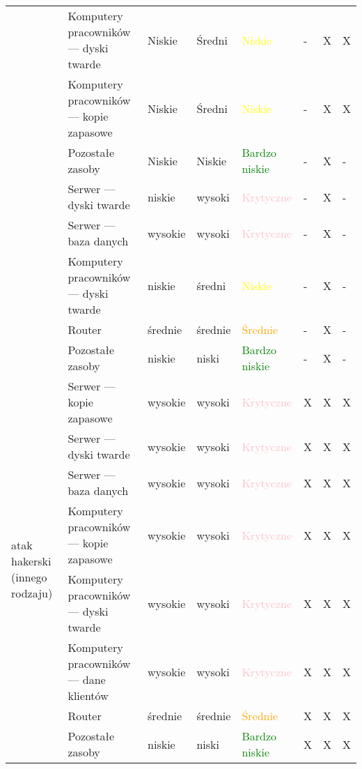 \begin{landscape}
\begin{longtable}[ht!]{|m{3cm}|m{6cm}|m{4.5cm}|m{3cm}|m{3cm}|m{0.5cm}|m{0.5cm}|m{0.5cm}|}
		& Komputery pracowników --- dyski twarde & Niskie & Średni & \textcolor{yellow}{Niskie} & - & X & X  \\ \cline{2-8}
		& Komputery pracowników --- kopie zapasowe & Niskie & Średni & \textcolor{yellow}{Niskie} & - & X & X  \\ \cline{2-8}
		& Pozostałe zasoby & Niskie & Niskie & \textcolor{green}{Bardzo niskie} & - & X & -  \\
		\hline
		\newpage
		\hline
		\multirow{4}{4cm}{atak DDoS}
		& Serwer --- dyski twarde & niskie  & wysoki & \textcolor{pink}{Krytyczne} & - & X & -  \\ \cline{2-8}
		& Serwer --- baza danych & wysokie & wysoki & \textcolor{pink}{Krytyczne} & - & X & -  \\ \cline{2-8} 
		& Komputery pracowników --- dyski twarde  & niskie  & średni & \textcolor{yellow}{Niskie} & - & X & -  \\ \cline{2-8}
		& Router & średnie  & średnie & \textcolor{orange}{Średnie} & - & X & -  \\ \cline{2-8} 
		& Pozostałe zasoby & niskie  & niski & \textcolor{green}{Bardzo niskie} & - & X & -  \\
		\hline
		\multirow{8}{4cm}{atak hakerski \linebreak (innego rodzaju)}
		& Serwer --- kopie zapasowe  & wysokie & wysoki & \textcolor{pink}{Krytyczne} & X & X & X  \\ \cline{2-8}
		& Serwer --- dyski twarde & wysokie  & wysoki & \textcolor{pink}{Krytyczne} & X & X & X  \\ \cline{2-8}
		& Serwer --- baza danych & wysokie & wysoki & \textcolor{pink}{Krytyczne} & X & X & X  \\ \cline{2-8}
		& Komputery pracowników --- kopie zapasowe & wysokie & wysoki & \textcolor{pink}{Krytyczne} & X & X & X  \\ \cline{2-8}
		& Komputery pracowników --- dyski twarde  & wysokie  & wysoki & \textcolor{pink}{Krytyczne}& X & X & X  \\ \cline{2-8}
		& Komputery pracowników --- dane klientów & wysokie & wysoki & \textcolor{pink}{Krytyczne} & X & X & X  \\ \cline{2-8}
		& Router & średnie  & średnie & \textcolor{orange}{Średnie} & X & X & X  \\ \cline{2-8}
		& Pozostałe zasoby & niskie  & niski & \textcolor{green}{Bardzo niskie} & X & X & X  \\
		\hline
	\end{longtable}
\end{landscape}

